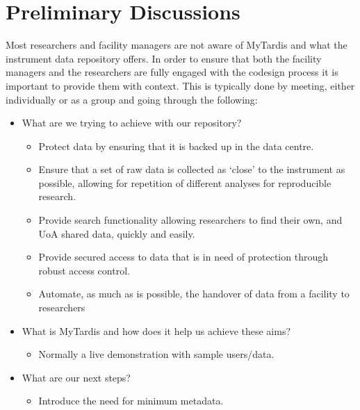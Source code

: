 \documentclass[letterpaper,10pt,english]{sphinxmanual}
\begin{document}
\section{Preliminary Discussions}
\label{\detokenize{index:preliminary-discussions}}\label{\detokenize{index:prelim}}
\sphinxAtStartPar
Most researchers and facility managers are not aware of MyTardis and what the instrument data repository offers. In order to ensure that both the facility managers and the researchers are fully engaged with the co\sphinxhyphen{}design process it is important to provide them with context. This is typically done by meeting, either individually or as a group and going through the following:
\begin{itemize}
\item {} 
\sphinxAtStartPar
What are we trying to achieve with our repository?
\begin{itemize}
\item {} 
\sphinxAtStartPar
Protect data by ensuring that it is backed up in the data centre.

\item {} 
\sphinxAtStartPar
Ensure that a set of raw data is collected as ‘close’ to the instrument as possible, allowing for repetition of different analyses for reproducible research.

\item {} 
\sphinxAtStartPar
Provide search functionality allowing researchers to find their own, and UoA shared data, quickly and easily.

\item {} 
\sphinxAtStartPar
Provide secured access to data that is in need of protection through robust access control.

\item {} 
\sphinxAtStartPar
Automate, as much as is possible, the hand\sphinxhyphen{}over of data from a facility to researchers

\end{itemize}

\item {} 
\sphinxAtStartPar
What is MyTardis and how does it help us achieve these aims?
\begin{itemize}
\item {} 
\sphinxAtStartPar
Normally a live demonstration with sample users/data.

\end{itemize}

\item {} 
\sphinxAtStartPar
What are our next steps?
\begin{itemize}
\item {} 
\sphinxAtStartPar
Introduce the need for minimum metadata.


\end{itemize}
\end{itemize}
\end{document}
